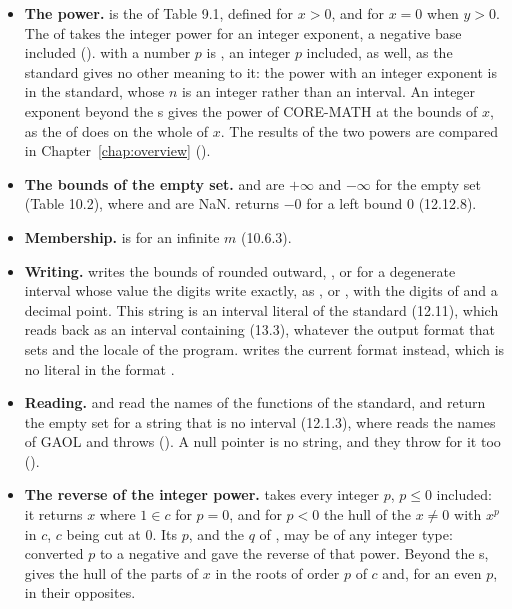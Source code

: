 \documentclass[12pt,a4paper,twoside,openright]{book}
\begin{document}
\begin{itemize}
\item[$\bullet$] \textbf{The power.}  is the  of
  Table 9.1, defined for $x>0$, and for $x=0$ when $y>0$. The  of
   takes the integer power for an integer exponent, a negative
  base included ().  with a number $p$ is
  , an integer $p$ included,  as well, as
  the standard gives no other meaning to it: the power with an integer
  exponent is  in the standard, whose $n$ is an integer
  rather than an interval. An integer exponent beyond the s gives
  the power of CORE-MATH at the bounds of $x$, as the  of
   does on the whole of $x$. The results of the two powers are
  compared in Chapter~\ref{chap:overview} ().
\item[$\bullet$] \textbf{The bounds of the empty set.}  and
   are $+\infty$ and $-\infty$ for the empty set (Table 10.2),
  where  and  are NaN.  returns $-0$
  for a left bound 0 (12.12.8).
\item[$\bullet$] \textbf{Membership.}  is 
  for an infinite $m$ (10.6.3).
\item[$\bullet$] \textbf{Writing.}  writes the
  bounds of  rounded outward, \code{[l, r]}, or \code{[a]} for a
  degenerate interval whose value the digits write exactly, as \code{[4]},
  or \code{[empty]}, with the digits of  and a
  decimal point. This string is an interval literal of the standard (12.11),
  which  reads back as an interval containing
   (13.3), whatever the output format that
   sets and the locale of the program.
   writes the current format instead, which is no
  literal in the format .\newinvfive
\item[$\bullet$] \textbf{Reading.}  and
   read the names of the functions of the standard,
  and return the empty set for a string that is no interval (12.1.3), where
   reads the names of GAOL and throws
  (). A null pointer is no string, and they throw
   for it too ().%
  \newinvfive
\item[$\bullet$] \textbf{The reverse of the integer power.}
   takes every integer $p$, $p\leq0$ included: it
  returns $x$ where $1\in c$ for $p=0$, and for $p<0$ the hull of the
  $x\neq0$ with $x^p$ in $c$, $c$ being cut at $0$. Its $p$, and the $q$ of
  , may be of any integer type:
   converted $p$ to a negative 
  and gave the reverse of that power. Beyond the s,
   gives the hull of the parts of $x$ in the roots of order
  $p$ of $c$ and, for an even $p$, in their opposites.\newinvfive
\end{itemize}
\end{document}
